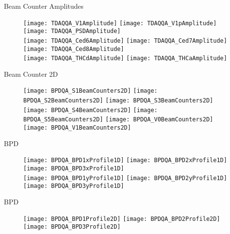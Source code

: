 \documentclass[11pt]{beamer}
\begin{document}
\begin{frame}{Beam Counter Amplitudes}
\begin{figure}
\centering
\texttt{[image: TDAQQA\_V1Amplitude]} 
\texttt{[image: TDAQQA\_V1pAmplitude]}
\texttt{[image: TDAQQA\_PSDAmplitude]} \\
\texttt{[image: TDAQQA\_Ced6Amplitude]}
\texttt{[image: TDAQQA\_Ced7Amplitude]} 
\texttt{[image: TDAQQA\_Ced8Amplitude]} \\
\texttt{[image: TDAQQA\_THCdAmplitude]} 
\texttt{[image: TDAQQA\_THCaAmplitude]} 
\end{figure}
\end{frame}

\begin{frame}{Beam Counter 2D}
\begin{figure}
\centering
\texttt{[image: BPDQA\_S1BeamCounters2D]} 
\texttt{[image: BPDQA\_S2BeamCounters2D]} 
\texttt{[image: BPDQA\_S3BeamCounters2D]}\\ 
\texttt{[image: BPDQA\_S4BeamCounters2D]} 
\texttt{[image: BPDQA\_S5BeamCounters2D]} 
\texttt{[image: BPDQA\_V0BeamCounters2D]}\\
\texttt{[image: BPDQA\_V1BeamCounters2D]} 
\end{figure}
\end{frame}

\begin{frame}{BPD}
\begin{figure}
\centering
\texttt{[image: BPDQA\_BPD1xProfile1D]}
\texttt{[image: BPDQA\_BPD2xProfile1D]}
\texttt{[image: BPDQA\_BPD3xProfile1D]} \\
\texttt{[image: BPDQA\_BPD1yProfile1D]}
\texttt{[image: BPDQA\_BPD2yProfile1D]}
\texttt{[image: BPDQA\_BPD3yProfile1D]} \\
\end{figure}
\end{frame}

\begin{frame}{BPD}
\begin{figure}
\centering
\texttt{[image: BPDQA\_BPD1Profile2D]}
\texttt{[image: BPDQA\_BPD2Profile2D]}
\texttt{[image: BPDQA\_BPD3Profile2D]} 
\end{figure}
\end{frame}
\end{document}
